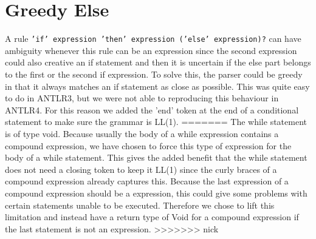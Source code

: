 \section{Greedy Else}
A rule \texttt{'if' expression 'then' expression ('else' expression)?} can have ambiguity whenever this rule can be an expression since the second expression could also creative an if statement and then it is uncertain if the else part belongs to the first or the second if expression. To solve this, the parser could be greedy in that it always matches an if statement as close as possible. This was quite easy to do in ANTLR3, but we were not able to reproducing this behaviour in ANTLR4. For this reason we added the 'end' token at the end of a conditional statement to make sure the grammar is LL(1).
=======
The while statement is of type void. Because usually the body of a while expression contains a compound expression, we have chosen to force this type of expression for the body of a while statement. This gives the added benefit that the while statement does not need a closing token to keep it LL(1) since the curly braces of a compound expression already captures this. Because the last expression of a compound expression should be a expression, this could give some problems with certain statements unable to be executed. Therefore we chose to lift this limitation and instead have a return type of Void for a compound expression if the last statement is not an expression.
>>>>>>> nick

